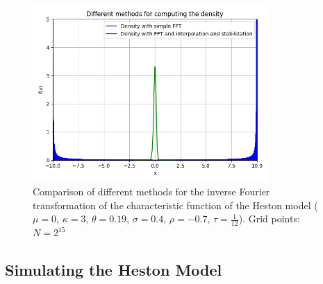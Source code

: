 \begin{figure}[h]
    \centering
    \includegraphics[width=0.8\textwidth]{img/different_ifft_methods.png}
    \caption{Comparison of different methods for the inverse Fourier transformation of the characteristic function of the Heston model ($\mu=0$, $\kappa=3$, $\theta=0.19$, $\sigma=0.4$, $\rho=-0.7$, $\tau=\frac{1}{12}$). Grid points: $N=2^{15}$}
    \label{fig:ifft_comparison}
\end{figure}

\subsection{Simulating the Heston Model}